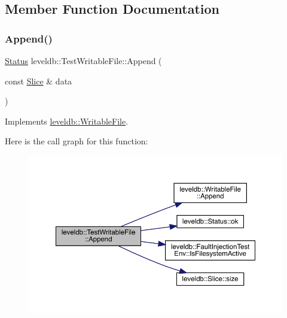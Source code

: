 \subsection{Member Function Documentation}
\mbox{\label{classleveldb_1_1_test_writable_file_a282d3c3c27ef70c65f467f50abfd93bb}} 
\subsubsection{\texorpdfstring{Append()}{Append()}}
{\footnotesize\ttfamily \mbox{\hyperlink{classleveldb_1_1_status}{Status}} leveldb\+::\+Test\+Writable\+File\+::\+Append (\begin{DoxyParamCaption}\item[{const \mbox{\hyperlink{classleveldb_1_1_slice}{Slice}} \&}]{data }\end{DoxyParamCaption})\hspace{0.3cm}{\ttfamily [virtual]}}



Implements \mbox{\hyperlink{classleveldb_1_1_writable_file_a53b41841d9577d28f65d4d90e1660de8}{leveldb\+::\+Writable\+File}}.

Here is the call graph for this function\+:
\nopagebreak
\begin{figure}[H]
\begin{center}
\leavevmode
\includegraphics[width=350pt]{classleveldb_1_1_test_writable_file_a282d3c3c27ef70c65f467f50abfd93bb_cgraph}
\end{center}
\end{figure}
\mbox{\label{classleveldb_1_1_test_writable_file_a98284f2e88a705a3c18961f198e94038}} 
